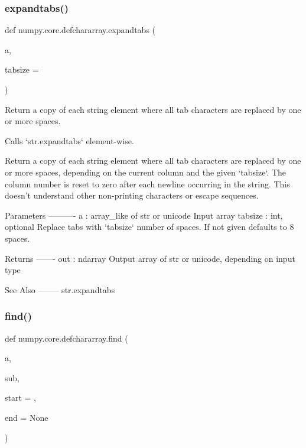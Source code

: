 \subsubsection{\texorpdfstring{expandtabs()}{expandtabs()}}
{\footnotesize\ttfamily def numpy.\+core.\+defchararray.\+expandtabs (\begin{DoxyParamCaption}\item[{}]{a,  }\item[{}]{tabsize = {} }\end{DoxyParamCaption})}

\begin{DoxyVerb}Return a copy of each string element where all tab characters are
replaced by one or more spaces.

Calls `str.expandtabs` element-wise.

Return a copy of each string element where all tab characters are
replaced by one or more spaces, depending on the current column
and the given `tabsize`. The column number is reset to zero after
each newline occurring in the string. This doesn't understand other
non-printing characters or escape sequences.

Parameters
----------
a : array_like of str or unicode
    Input array
tabsize : int, optional
    Replace tabs with `tabsize` number of spaces.  If not given defaults
    to 8 spaces.

Returns
-------
out : ndarray
    Output array of str or unicode, depending on input type

See Also
--------
str.expandtabs\end{DoxyVerb}
 \mbox{\label{namespacenumpy_1_1core_1_1defchararray_afbf7ccc1eace251be1ee26ee1deb0e14}} 
\subsubsection{\texorpdfstring{find()}{find()}}
{\footnotesize\ttfamily def numpy.\+core.\+defchararray.\+find (\begin{DoxyParamCaption}\item[{}]{a,  }\item[{}]{sub,  }\item[{}]{start = {},  }\item[{}]{end = {\ttfamily None} }\end{DoxyParamCaption})}

